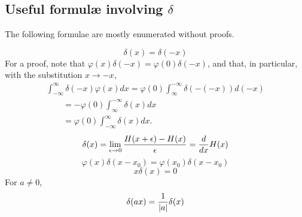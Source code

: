 \subsection{Useful formul\ae{} involving $\delta$}

The following formulae are mostly enumerated without proofs.


 \begin{equation}
 \delta (x)=\delta (-x)
 \end{equation}
{\color{OliveGreen}
\bproof
For a proof, note that $\varphi (x)\delta (-x) = \varphi (0)\delta (-x)$, and that, in particular,
with the substitution $x \rightarrow -x$,
 \begin{equation}
 \begin{split}
\int _{-\infty}^\infty \delta (-x)  \varphi(x) dx   =
 \varphi(0) \int _\infty ^{-\infty}\delta (-(-x))  d(-x) \\ \qquad =
-\varphi(0) \int _\infty ^{-\infty}\delta (x)  d x   \\ \qquad =
\varphi(0) \int _{-\infty}^\infty \delta (x)  d x .
 \end{split}
 \end{equation}
\eproof
}
 \begin{equation}
 \delta (x)=\lim_{\epsilon \rightarrow 0}{H (x+\epsilon )
 -H (x)\over \epsilon }={d\over dx}H (x) \end{equation}
 \begin{equation}
 \varphi (x)\delta (x-x_0)
 =
 \varphi (x_0)\delta (x-x_0)
 \end{equation}
 \begin{equation}
 x\delta (x)=0
 \end{equation}
For $a\neq 0$,
 \begin{equation}
 \delta (ax)={1\over \vert a\vert }\delta (x)
\label{2011-m-distdp}
 \end{equation}
